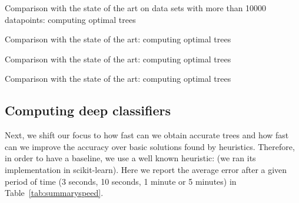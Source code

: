 \documentclass{llncs}
\begin{document}
\begin{table}[htbp]
\begin{center}
\begin{footnotesize}
\tabcolsep=1.7pt

\end{footnotesize}
\end{center}
\caption{\label{tab:summaryacclarge} Comparison with the state of the art on data sets with more than 10000 datapoints: computing optimal trees}
\end{table}


\begin{table}[htbp]
\begin{center}
\begin{footnotesize}
\tabcolsep=1.7pt

\end{footnotesize}
\end{center}
\caption{\label{tab:summaryacc} Comparison with the state of the art: computing optimal trees}
\end{table}

\begin{table}[htbp]
\begin{center}
\begin{footnotesize}
\tabcolsep=1.7pt

\end{footnotesize}
\end{center}
\caption{\label{tab:summaryacc} Comparison with the state of the art: computing optimal trees}
\end{table}


\begin{table}[htbp]
\begin{center}
\begin{footnotesize}
\tabcolsep=1.7pt

\end{footnotesize}
\end{center}
\caption{\label{tab:summaryacc} Comparison with the state of the art: computing optimal trees}
\end{table}


\subsection{Computing deep classifiers}

Next, we shift our focus to how fast can we obtain accurate trees and how fast can we improve the accuracy over basic solutions found by heuristics.
Therefore, in order to have a baseline, we use a well known heuristic: \cart (we ran its implementation in scikit-learn).
Here we report the average error after a given period of time (3 seconds, 10 seconds, 1 minute or 5 minutes) in Table~\ref{tab:summaryspeed}.
\end{document}
